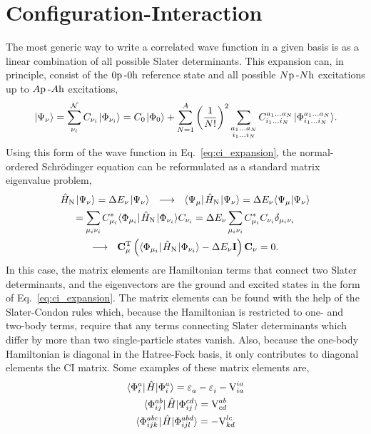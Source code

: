 \documentclass[thesis.tex]{subfiles}
\begin{document}
\section{Configuration-Interaction} \label{section:configuration_interaction}
The most generic way to write a correlated wave function in a given basis is as a linear combination of all possible Slater determinants.  This expansion can, in principle, consist of the $0\mathrm{p}\hspace{2pt}\text{-}0\mathrm{h}$ reference state and all possible $N\mathrm{p}\hspace{2pt}\text{-}N\mathrm{h}$ excitations up to $A\mathrm{p}\hspace{2pt}\text{-}A\mathrm{h}$ excitations,
\begin{equation} \label{eq:ci_expansion}
  \hspace{1pt}\lvert \Psi_{\nu} \rangle = \sum_{\nu_{i}}^{\mathcal{N}}C_{\nu_{i}}\hspace{1pt}\lvert \Phi_{\nu_{i}} \rangle = C_{0}\hspace{1pt}\lvert \Phi_{0} \rangle + \sum_{N=1}^{A}\left(\frac{1}{N!}\right)^2 \sum_{\substack{a_{1} \ldots a_{N} \\ i_{1} \ldots i_{N}}} C^{a_{1} \ldots a_{N}}_{i_{1} \ldots i_{N}}\hspace{1pt}\lvert \Phi^{a_{1} \ldots a_{N}}_{i_{1} \ldots i_{N}} \rangle.
\end{equation}
Using this form of the wave function in Eq.\ \eqref{eq:ci_expansion}, the normal-ordered Schr\"{o}dinger equation can be reformulated as a standard matrix eigenvalue problem,
\begin{gather}
  \HamN\ket{\Psi_{\nu}} = \Ecorr_{\nu}\ket{\Psi_{\nu}}\ \ \longrightarrow\ \ \element{\Psi_{\mu}}{\HamN}{\Psi_{\nu}} = \Ecorr_{\nu}\braket{\Psi_{\mu}}{\Psi_{\nu}} \notag \\
  = \sum_{\mathclap{\mu_{i}\nu_{i}}}C^{*}_{\mu_{i}}\element{\Phi_{\mu_{i}}}{\HamN}{\Phi_{\nu_{i}}}C_{\nu_{i}} = \Ecorr_{\nu}\sum_{\mathclap{\mu_{i}\nu_{i}}}C^{*}_{\mu_{i}}C_{\nu_{i}}\delta_{\mu_{i}\nu_{i}} \notag \\
  \longrightarrow\ \ \mathbf{C}^{\text{T}}_{\mu}\left(\element{\Phi_{\mu_{i}}}{\HamN}{\Phi_{\nu_{i}}} - \Ecorr_{\nu}\mathbf{I}\right)\mathbf{C}_{\nu} = 0.
\end{gather}
In this case, the matrix elements are Hamiltonian terms that connect two Slater determinants, and the eigenvectors are the ground and excited states in the form of Eq.\ \eqref{eq:ci_expansion}.  The matrix elements can be found with the help of the Slater-Condon rules \cite{SLATER1929,CONDON1930} which, because the Hamiltonian is restricted to one- and two-body terms, require that any terms connecting Slater determinants which differ by more than two single-particle states vanish.  Also, because the one-body Hamiltonian is diagonal in the Hatree-Fock basis, it only contributes to diagonal elements the CI matrix.  Some examples of these matrix elements are,
\begin{gather} \label{eq:slater_condon}
  \element{\Phi^{a}_{i}}{\Ham}{\Phi^{a}_{i}} = \Edenom{}{a} - \Edenom{}{i} - \vint{ia}{ia} \\
  \element{\Phi^{ab}_{ij}}{\Ham}{\Phi^{cd}_{ij}} = \vint{ab}{cd} \\
  \element{\Phi^{abc}_{ijk}}{\Ham}{\Phi^{abd}_{ijl}} = -\vint{lc}{kd}
\end{gather}
\end{document}
